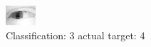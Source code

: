 \begin{figure}[h!]
\begin{center}
\includegraphics[width=0.60\columnwidth]{figures/ID2421_class_3_target_4.png}
\end{center}
\caption{ Classification: 3 actual target: 4}
\label{fig:ID2421_class_3_target_4}
\end{figure}
